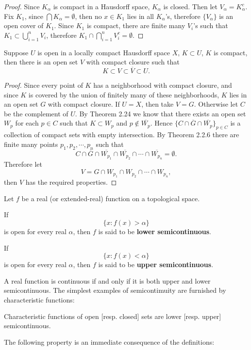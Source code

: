\begin{proof}
Since $K_\alpha$ is compact in a Hausdorff space, $K_\alpha$ is closed. Then let $V_\alpha=K_\alpha^c$. Fix $K_1$, since $\bigcap K_\alpha=\emptyset$, then no $x\in K_1$ lies in all $K_\alpha$'s, therefore $\{V_\alpha\}$ is an open cover of $K_1$. Since $K_1$ is compact, there are finite many $V_i$'s such that $K_1\subset\bigcup_{i=1}^n V_i$, therefore $K_1\cap\bigcap_{i=1}^nV_i^c=\emptyset$.
\end{proof}
\begin{theorem}
Suppose $U$ is open in a locally compact Hausdorff space $X$, $K\subset U$, $K$ is compact, then there is an open set $V$ with compact closure such that 
$$K\subset V\subset\overline{V}\subset U.$$
\end{theorem}
\begin{proof}
Since every point of $K$ has a neighborhood with compact closure, and since $K$ is covered by the union of finitely many of these neighborhoods, $K$ lies in an open set $G$ with compact closure. If $U=X$, then take $V=G$. Otherwise let $C$ be the complement of $U$. By Theorem 2.24 we know that there exists an open set $W_p$ for each $p\in C$ such that $K\subset W_p$ and $p\notin\overline{W_p}$. Hence $\{C\cap\overline{G}\cap\overline{W_p}\}_{p\in C}$ is a collection of compact sets with empty intersection. By Theorem 2.2.6 there are finite many points $p_1,p_2,\cdots,p_n$ such that 
$$
C\cap \overline{G}\cap \overline{W_{p_1}}\cap \overline{W_{p_2}}\cap \cdots \cap \overline{W_{p_n}}=\emptyset .
$$
Therefore let 
$$
V=G\cap W_{p_1}\cap W_{p_2}\cap \cdots \cap W_{p_n},
$$
then $V$ has the required properties.
\end{proof}
\begin{definition}
Let $f$ be a real (or extended-real) function on a topological space.\par
If
$$\{x:f(x)>\alpha\}$$
is open for every real $\alpha$, then $f$ is said to be \textbf{lower semicontinuous}.\par
If 
$$\{x:f(x)<\alpha\}$$
is open for every real $\alpha$, then $f$ is said to be \textbf{upper semicontinuous}.
\end{definition}
A real function is continuous if and only if it is both upper and lower semicontinuous. The simplest examples of semicontimuity are furnished by characteristic functions:\par
Characteristic functions of open [resp. closed] sets are lower [resp. upper] semicontinuous.\par
The following property is an immediate consequence of the definitions:
